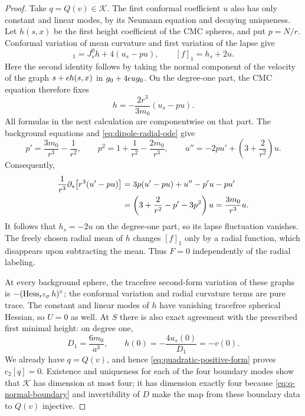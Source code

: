 \begin{proof}
Take $q=Q(v)\in\mathcal K$.  The first conformal coefficient $u$
also has only constant and linear modes, by its Neumann equation and
decaying uniqueness.  Let $h(s,x)$ be the first height coefficient
of the CMC spheres, and put $p=N/r$.  Conformal variation of mean
curvature and first variation of the lapse give
\begin{equation}
 [H]_1=J_s^0h+4(u_s-pu),
 \qquad [f]_1=h_s+2u.
 \label{eq:first-cmc-conformal-variations}
\end{equation}
Here the second identity follows by taking the normal component of
the velocity of the graph $s+\epsilon h(s,x)$ in
$g_0+4\epsilon u g_0$.
On the degree-one part, the CMC equation therefore fixes
\begin{equation}
 h=-\frac{2r^3}{3m_0}(u_s-pu).
 \label{eq:dipole-cmc-height}
\end{equation}
All formulas in the next calculation are componentwise on that part.
The background equations and \eqref{eq:dipole-radial-ode} give
\[
 p'=\frac{3m_0}{r^3}-\frac1{r^2},\qquad
 p^2=1+\frac1{r^2}-\frac{2m_0}{r^3},\qquad
 u''=-2pu'+\left(3+\frac2{r^2}\right)u.
\]
Consequently,
\begin{align}
 \frac1{r^3}\partial_s\bigl[r^3(u'-pu)\bigr]
 &=3p(u'-pu)+u''-p'u-pu'\notag\\
 &=\left(3+\frac2{r^2}-p'-3p^2\right)u
 =\frac{3m_0}{r^3}u.
 \label{eq:dipole-cancellation}
\end{align}
It follows that $h_s=-2u$ on the degree-one part, so its lapse
fluctuation vanishes.  The freely chosen radial mean of $h$ changes
$[f]_1$ only by a radial function, which disappears upon subtracting
the mean.  Thus $F=0$ independently of the radial labeling.

At every background sphere, the tracefree second-form variation of
these graphs is $-(\operatorname{Hess}_{r^2\sigma}h)^{\circ}$; the conformal
variation and radial curvature terms are pure trace.
The constant and linear modes of $h$ have vanishing tracefree
spherical Hessian, so $U=0$ as well.
At $S$ there is also exact agreement with the prescribed first minimal
height: on degree one,
\[
 D_1=\frac{6m_0}{a^3},\qquad
 h(0)=-\frac{4u_s(0)}{D_1}=-v(0).
\]
We already have $q=Q(v)$, and hence
\eqref{eq:quadratic-positive-form} proves $c_2[q]=0$.
Existence and uniqueness for each of the four boundary modes show
that $\mathcal K$ has dimension at most four; it has dimension
exactly four because \eqref{eq:q-normal-boundary} and invertibility
of $D$ make the map from these boundary data to $Q(v)$ injective.


\end{proof}
